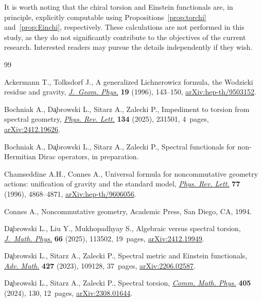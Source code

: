 \documentclass[10pt,a4paper]{amsart}
\numberwithin{equation}{section}
\theoremstyle{definition}
\let\MFOriginalCedilla\c
\renewcommand{\c}[1]{{\MFcedillafont\MFOriginalCedilla{#1}}}
\begin{document}
It is worth noting that the chiral torsion and Einstein functionals are, in principle, explicitly computable using Propositions~\ref{prop:torchi} and~\ref{prop:Einchi}, respectively. These calculations are not performed in this study, as they do not significantly contribute to the objectives of the current research. Interested readers may pursue the details independently if they wish.


\begin{thebibliography}{99}
\footnotesize\itemsep=0pt

Ackermann T., Tolksdorf J., A generalized {L}ichnerowicz formula, the
 {W}odzicki residue and gravity,
 \href{https://doi.org/10.1016/0393-0440(95)00030-5}{\textit{J.~Geom. Phys.}}
 \textbf{19} (1996), 143--150,
 \href{http://arxiv.org/abs/hep-th/9503152}{arXiv:hep-th/9503152}.

Bochniak A., D\c{a}browski L., Sitarz A., Zalecki P., Impediment to torsion
 from spectral geometry,
 \href{https://doi.org/10.1103/drdl-l2mp}{\textit{Phys. Rev. Lett.}}
 \textbf{134} (2025), 231501, 4~pages,
 \href{http://arxiv.org/abs/2412.19626}{arXiv:2412.19626}.

Bochniak A., D\c{a}browski L., Sitarz A., Zalecki P., Spectral functionals for
 non-{H}ermitian {D}irac operators, {i}n preparation.

Chamseddine A.H., Connes A., Universal formula for noncommutative geometry
 actions: unification of gravity and the standard model,
 \href{https://doi.org/10.1103/PhysRevLett.77.4868}{\textit{Phys. Rev. Lett.}}
 \textbf{77} (1996), 4868--4871,
 \href{http://arxiv.org/abs/hep-th/9606056}{arXiv:hep-th/9606056}.

Connes A., Noncommutative geometry, Academic Press, San Diego, CA, 1994.

D\c{a}browski L., Liu Y., Mukhopadhyay S., Algebraic versus spectral torsion,
 \href{https://doi.org/10.1063/5.0281331}{\textit{J.~Math. Phys.}} \textbf{66}
 (2025), 113502, 19~pages,
 \href{http://arxiv.org/abs/2412.19949}{arXiv:2412.19949}.

D\c{a}browski L., Sitarz A., Zalecki P., Spectral metric and {E}instein
 functionals, \href{https://doi.org/10.1016/j.aim.2023.109128}{\textit{Adv.
 Math.}} \textbf{427} (2023), 109128, 37~pages,
 \href{http://arxiv.org/abs/2206.02587}{arXiv:2206.02587}.

D\c{a}browski L., Sitarz A., Zalecki P., Spectral torsion,
 \href{https://doi.org/10.1007/s00220-024-04950-7}{\textit{Comm. Math. Phys.}}
 \textbf{405} (2024), 130, 12~pages,
 \href{http://arxiv.org/abs/2308.01644}{arXiv:2308.01644}.


\end{thebibliography}
\end{document}

